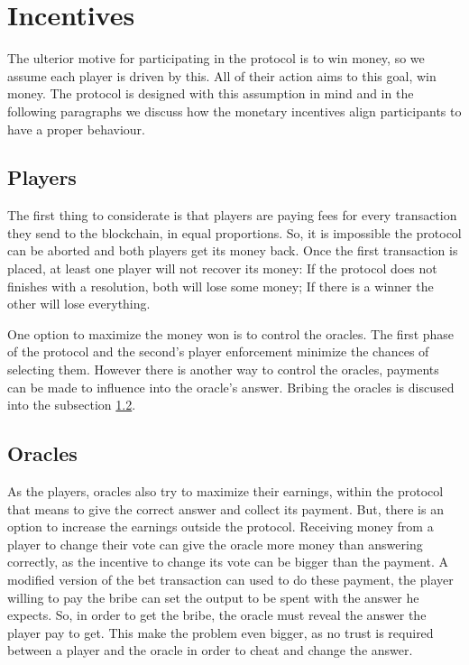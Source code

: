 \section{Incentives}

The ulterior motive for participating in the protocol is to win money, so we
  assume each player is driven by this.
All of their action aims to this goal, win money. The protocol is designed with
  this assumption in mind and in the following paragraphs we discuss how the
  monetary incentives align participants to have a proper behaviour.

\subsection{Players}
The first thing to considerate is that players are paying fees for every
  transaction they send to the blockchain, in equal proportions.
So, it is impossible the protocol can be aborted and both players get its
  money back.
Once the first transaction is placed, at least one player will not recover its
  money: If the protocol does not finishes with a resolution, both will lose
  some money; If there is a winner the other will lose everything.

One option to maximize the money won is to control the oracles.
The first phase of the protocol and the second's player enforcement
  minimize the chances of selecting them.
However there is another way to control the oracles, payments can be made to
  influence into the oracle's answer.
Bribing the oracles is discused into the subsection \ref{subsec:inc_oracles}.




\subsection{Oracles} \label{subsec:inc_oracles}

As the players, oracles also try to maximize their earnings, within the protocol
  that means to give the correct answer and collect its payment.
But, there is an option to increase the earnings outside the protocol. Receiving
  money from a player to change their vote can give the oracle more money than
  answering correctly, as the incentive to change its vote can be bigger than
  the payment.
A modified version of the bet transaction can used to do these payment, the
  player willing to pay the bribe can set the output to be spent with the answer
  he expects.
So, in order to get the bribe, the oracle must reveal the answer the player pay
  to get.
This make the problem even bigger, as no trust is required between a player and
  the oracle in order to cheat and change the answer.

